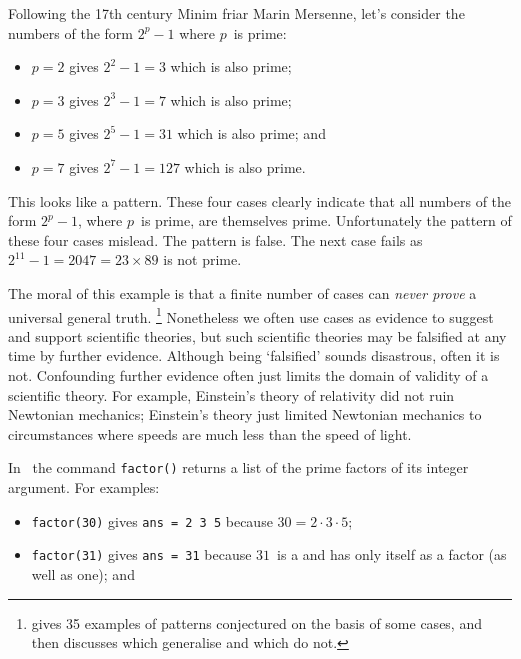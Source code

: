 \begin{draft}
\begin{example}
Following the 17th century Minim friar Marin Mersenne, let's consider the numbers of the form \(2^p-1\) where \(p\)~is prime:
\begin{itemize}
\item \(p=2\) gives \(2^2-1=3\) which is also prime;
\item \(p=3\) gives \(2^3-1=7\) which is also prime;
\item \(p=5\) gives \(2^5-1=31\) which is also prime; and
\item \(p=7\) gives \(2^7-1=127\) which is also prime.
\end{itemize}
This looks like a pattern.
These four cases clearly indicate that all numbers of the form \(2^p-1\), where \(p\)~is prime, are themselves prime.
Unfortunately the pattern of these four cases mislead. 
The pattern is false.
The next case fails as \(2^{11}-1= 2047 =23\times 89\) is not prime.
\end{example}


The moral of this example is that a finite number of cases can \emph{never prove} a universal general truth.
\footnote{\cite{Guy88} gives 35 examples of patterns conjectured on the basis of some cases, and then discusses which generalise and which do not.}
Nonetheless we often use cases as evidence to suggest and support scientific theories, but such scientific theories may be falsified at any time by further evidence.
Although being `falsified' sounds disastrous, often it is not.
Confounding further evidence often just limits the domain of validity of a scientific theory.
For example, Einstein's theory of relativity did not ruin Newtonian mechanics; Einstein's theory just limited Newtonian mechanics to circumstances where speeds are much less than the speed of light.




\begin{example} \label{eg:}
In \script\ the command \verb|factor()| returns a list of the prime factors of its integer argument.  
For examples: 
\begin{itemize}
\item \verb|factor(30)| gives \verb|ans = 2 3 5| because \(30=2\cdot3\cdot 5\);

\item \verb|factor(31)| gives \verb|ans = 31| because \(31\)~is a  and has only itself as a factor (as well as one); and


\end{itemize}
\end{example}
\end{draft}
